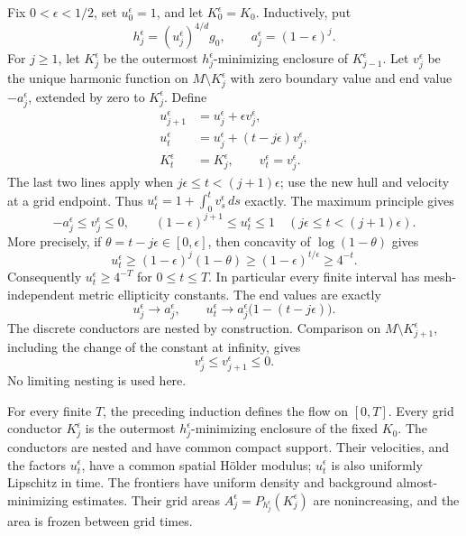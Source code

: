 Fix $0<\epsilon<1/2$, set $u_0^\epsilon=1$, and let
$K_0^\epsilon=K_0$. Inductively, put
\[
 h_j^\epsilon=(u_j^\epsilon)^{4/d}g_0,
 \qquad a_j^\epsilon=(1-\epsilon)^j.
\]
For $j\ge1$, let $K_j^\epsilon$ be the outermost
$h_j^\epsilon$-minimizing enclosure of $K_{j-1}^\epsilon$.
Let $v_j^\epsilon$ be the unique harmonic function on
$M\setminus K_j^\epsilon$ with zero boundary value and end value
$-a_j^\epsilon$, extended by zero to $K_j^\epsilon$. Define
\begin{equation}
\label{eq:rpi:flow-euler}
 \begin{aligned}
 u_{j+1}^\epsilon&=u_j^\epsilon+\epsilon v_j^\epsilon,\\
 u_t^\epsilon&=u_j^\epsilon+(t-j\epsilon)v_j^\epsilon,\\
 K_t^\epsilon&=K_j^\epsilon,\qquad
 v_t^\epsilon=v_j^\epsilon.
 \end{aligned}
\end{equation}
The last two lines apply when $j\epsilon\le t<(j+1)\epsilon$;
use the new hull and velocity at a grid endpoint.
Thus $u_t^\epsilon=1+\int_0^t v_s^\epsilon\,ds$ exactly.
The maximum principle gives
\[
 -a_j^\epsilon\le v_j^\epsilon\le0,
 \qquad
 (1-\epsilon)^{j+1}\le u_t^\epsilon\le1
 \quad(j\epsilon\le t<(j+1)\epsilon).
\]
More precisely, if $\theta=t-j\epsilon\in[0,\epsilon]$, then
concavity of $\log(1-\theta)$ gives
\[
 u_t^\epsilon\ge(1-\epsilon)^j(1-\theta)
 \ge(1-\epsilon)^{t/\epsilon}\ge4^{-t}.
\]
Consequently $u_t^\epsilon\ge4^{-T}$ for $0\le t\le T$.
In particular every finite interval has mesh-independent metric
ellipticity constants. The end values are exactly
\[
 u_j^\epsilon\longrightarrow a_j^\epsilon,
 \qquad
 u_t^\epsilon\longrightarrow
 a_j^\epsilon\bigl(1-(t-j\epsilon)\bigr).
\]
The discrete conductors are nested by construction. Comparison on
$M\setminus K_{j+1}^\epsilon$, including the change of the constant
at infinity, gives
\begin{equation}
\label{eq:rpi:flow-discrete-velocity-monotonicity}
 v_j^\epsilon\le v_{j+1}^\epsilon\le0.
\end{equation}
No limiting nesting is used here.


\begin{lemma}
\label{lem:rpi:discrete-flow}
For every finite $T$, the preceding induction defines the flow on
$[0,T]$. Every grid conductor $K_j^\epsilon$ is the outermost
$h_j^\epsilon$-minimizing enclosure of the fixed $K_0$. The conductors
are nested and have common compact support. Their velocities, and the
factors $u_t^\epsilon$, have a common spatial H\"older modulus;
$u_t^\epsilon$ is also uniformly Lipschitz in time. The frontiers have
uniform density and background almost-minimizing estimates.
Their grid areas $A_j^\epsilon=P_{h_j^\epsilon}(K_j^\epsilon)$
are nonincreasing, and the area is frozen between grid times.
\end{lemma}


